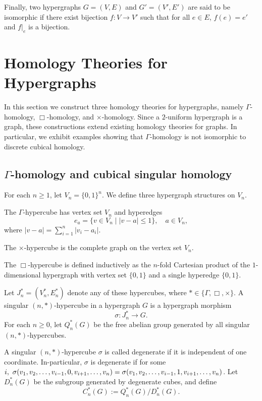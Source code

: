 \documentclass[10pt,a4paper]{amsart}
\begin{document}
Finally, two hypergraphs $G=(V,E)$ and $G'=(V',E')$ are said to be isomorphic if 
there exist bijection $f \colon V \to V'$  such that for all $e \in E$, $f(e)=e'$  and $f|_e$ is a bijection.


\section{Homology Theories for Hypergraphs}\label{ch.hom}

In this section we construct three homology theories for hypergraphs, namely $\Gamma$-homology, $\Box$-homology, and $\times$-homology. Since a $2$-uniform hypergraph is a graph, these constructions extend existing homology theories for graphs. In particular, we exhibit examples showing that $\Gamma$-homology is not isomorphic to discrete cubical homology.

\subsection{$\Gamma$-homology and cubical singular homology}
For each $n \geq 1$, let $V_n = \{0,1\}^n$. We define three hypergraph structures on $V_n$.

The $\Gamma$-hypercube has vertex set $V_n$ and hyperedges
\[
e_a = \{ v \in V_n \mid |v-a| \leq 1 \}, \quad a \in V_n,
\]
where $|v-a| = \sum_{i=1}^n |v_i - a_i|$.

The $\times$-hypercube is the complete graph on the vertex set $V_n$.

The $\Box$-hypercube is defined inductively as the $n$-fold Cartesian product of the $1$-dimensional hypergraph with vertex set $\{0,1\}$ and a single hyperedge $\{0,1\}$.

Let $J_n^*=(V_n^*,E_n^*)$ denote any of these hypercubes, where $* \in \{\Gamma, \Box, \times\}$.
A singular $(n,*)$-hypercube in a hypergraph $G$ is a hypergraph morphism
\[
\sigma \colon J_n^* \to G.
\]
For each $n \geq 0$, let $Q_n^*(G)$ be the free abelian group generated by all singular $(n,*)$-hypercubes.

A singular $(n,*)$-hypercube $\sigma$ is called degenerate if it is independent of one coordinate. In-particular, $\sigma$ is degenerate if for some $i,~\sigma(v_1,v_2,\ldots,v_{i-1},\\ 0,v_{i+1},\ldots,v_n)=\sigma(v_1,v_2,\ldots,v_{i-1},1,v_{i+1},\ldots,v_n)$. Let $D_n^*(G)$ be the subgroup generated by degenerate cubes, and define
\[
C_n^*(G) := Q_n^*(G)/D_n^*(G).
\]
\end{document}
